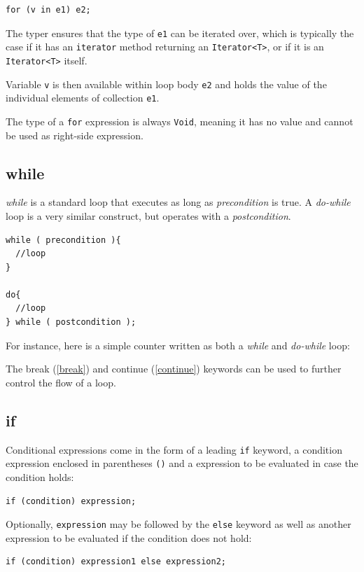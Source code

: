 \documentclass{article}
\newcommand{\type}[1]{\texttt{#1}}
\newcommand{\expr}[1]{\texttt{#1}}
\newcommand{\tref}[2]{#1 (\ref{#2})}
\newcommand{\haxe}[2][]{%
}
\begin{document}
\begin{lstlisting}
for (v in e1) e2;
\end{lstlisting}

The typer ensures that the type of \expr{e1} can be iterated over, which is typically the case if it has an \expr{iterator} method returning an \type{Iterator<T>}, or if it is an \type{Iterator<T>} itself.

Variable \expr{v} is then available within loop body \expr{e2} and holds the value of the individual elements of collection \expr{e1}.

The type of a \expr{for} expression is always \type{Void}, meaning it has no value and cannot be used as right-side expression.

\subsection{while}
\label{while}
\emph{while} is a standard loop that executes as long as \emph{precondition} is true.  A \emph{do-while} loop is a very similar construct, but operates with a \emph{postcondition}.
\begin{lstlisting}
while ( precondition ){ 
  //loop
}

do{
  //loop 
} while ( postcondition );
\end{lstlisting}

For instance, here is a simple counter written as both a \emph{while} and \emph{do-while} loop:

\haxe{assets/WhileLoop.hx}

The \tref{break}{break} and \tref{continue}{continue} keywords can be used to further control the flow of a loop.
\subsection{if}
\label{if}

Conditional expressions come in the form of a leading \expr{if} keyword, a condition expression enclosed in parentheses \expr{()} and a expression to be evaluated in case the condition holds:

\begin{lstlisting}
if (condition) expression;
\end{lstlisting}

Optionally, \expr{expression} may be followed by the \expr{else} keyword as well as another expression to be evaluated if the condition does not hold:

\begin{lstlisting}
if (condition) expression1 else expression2;
\end{lstlisting}
\end{document}
